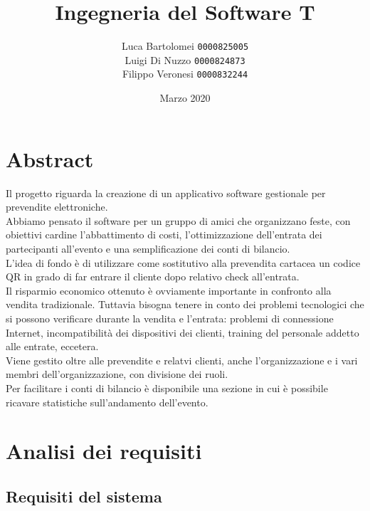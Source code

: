 \documentclass[a4paper]{article}
\title{Ingegneria del Software T}
\author{
    Luca Bartolomei 
    \texttt{0000825005}
    \\
    Luigi Di Nuzzo
    \texttt{0000824873}
    \\
    Filippo Veronesi
    \texttt{0000832244}
}
\date{Marzo 2020}
\begin{document}
\maketitle

\tableofcontents

\newpage

\section{Abstract}

Il progetto riguarda la creazione di un applicativo software gestionale per prevendite elettroniche.\\
Abbiamo pensato il software per un gruppo di amici che organizzano feste, con obiettivi cardine l'abbattimento di costi, l'ottimizzazione dell'entrata dei partecipanti all'evento e una semplificazione dei conti di bilancio.\\
L'idea di fondo è di utilizzare come sostitutivo alla prevendita cartacea un codice QR in grado di far entrare il cliente dopo relativo check all'entrata.\\
Il risparmio economico ottenuto è ovviamente importante in confronto alla vendita tradizionale. Tuttavia bisogna tenere in conto dei problemi tecnologici che si possono verificare durante la vendita e l'entrata: problemi di connessione Internet, incompatibilità dei dispositivi dei clienti, training del personale addetto alle entrate, eccetera.\\
Viene gestito oltre alle prevendite e relatvi clienti, anche l'organizzazione e i vari membri dell'organizzazione, con divisione dei ruoli.\\
Per facilitare i conti di bilancio è disponibile una sezione in cui è possibile ricavare statistiche sull'andamento dell'evento.

\section{Analisi dei requisiti}

\subsection{Requisiti del sistema}
\end{document}
